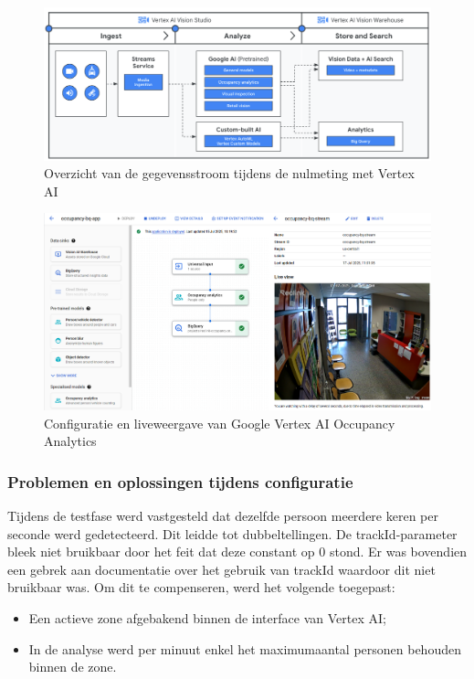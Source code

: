 \begin{figure}[H] 
    \centering
    \includegraphics[width=\linewidth]{img/bp/vertex/vertex-flowchart.png}
    \caption{Overzicht van de gegevensstroom tijdens de nulmeting met Vertex AI \autocite{Cloud2025}}
    \label{fig:flowchart}
\end{figure}

\begin{figure}[H] 
    \centering
    \includegraphics[width=16cm]{img/bp/vertex/combined_images.png}
    \caption{Configuratie en liveweergave van Google Vertex AI Occupancy Analytics}
    \label{fig:app}
\end{figure}

\subsubsection{Problemen en oplossingen tijdens configuratie}
Tijdens de testfase werd vastgesteld dat dezelfde persoon meerdere keren per seconde werd gedetecteerd. Dit leidde tot dubbeltellingen. De trackId-parameter bleek niet bruikbaar door het feit dat deze constant op 0 stond. Er was bovendien een gebrek aan documentatie over het gebruik van trackId waardoor dit niet bruikbaar was. Om dit te compenseren, werd het volgende toegepast:
\begin{itemize}
    \item Een actieve zone afgebakend binnen de interface van Vertex AI;
    \item In de analyse werd per minuut enkel het maximumaantal personen behouden binnen de zone.
\end{itemize}    

